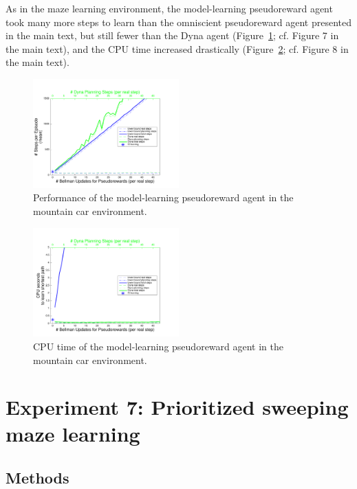 \documentclass[letterpaper]{article}
\begin{document}
As in the maze learning environment, the model-learning pseudoreward agent took many more steps to learn than the omniscient pseudoreward agent presented in the main text, but still fewer than the Dyna agent (Figure~\ref{fig:S4a}; cf. Figure 7 in the main text), and the CPU time increased drastically (Figure~\ref{fig:S4b}; cf. Figure 8 in the main text).

\begin{figure}[ht]
\centering
\includegraphics[width=0.5\textwidth]{MC_learning_vs_PRiterationsLearnMod_DYNA_mean}
\caption{Performance of the model-learning pseudoreward agent in the mountain car environment.}
\label{fig:S4a}
\end{figure}

\begin{figure}[ht]
\centering
\includegraphics[width=0.5\textwidth]{MC_cpus_vs_PRiterationsLearnMod_DYNA_toGoal}
\caption{CPU time of the model-learning pseudoreward agent in the mountain car environment.}
\label{fig:S4b}
\end{figure}

\pagebreak

\section{Experiment 7: Prioritized sweeping maze learning}

\subsection{Methods}
\end{document}
